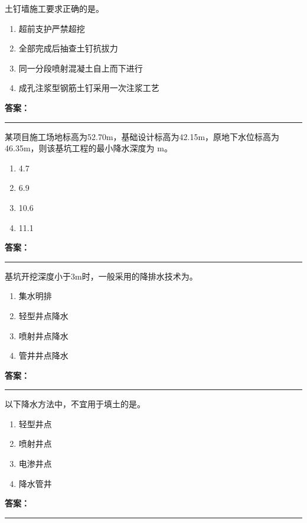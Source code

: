 \documentclass[UTF8,fontset=fandol,11pt]{ctexart}
\newcommand{\answerline}{\textcolor{answerred}{\rule{2.4cm}{0.7pt}}}
\begin{document}
\begin{quizbox}[title={第 10 题}]
土钉墙施工要求正确的是。\\
\begin{enumerate}[label=\Alph*.]
\item 超前支护严禁超挖
\item 全部完成后抽查土钉抗拔力
\item 同一分段喷射混凝土自上而下进行
\item 成孔注浆型钢筋土钉采用一次注浆工艺
\end{enumerate}
\textbf{\textcolor{answerred}{答案：}} \answerline
\end{quizbox}

\vspace{0.2em}

\begin{quizbox}[title={第 11 题}]
某项目施工场地标高为52.70m，基础设计标高为42.15m，原地下水位标高为46.35m，则该基坑工程的最小降水深度为 m。\\
\begin{enumerate}[label=\Alph*.]
\item 4.7
\item 6.9
\item 10.6
\item 11.1
\end{enumerate}
\textbf{\textcolor{answerred}{答案：}} \answerline
\end{quizbox}

\vspace{0.2em}

\begin{quizbox}[title={第 12 题}]
基坑开挖深度小于3m时，一般采用的降排水技术为。\\
\begin{enumerate}[label=\Alph*.]
\item 集水明排
\item 轻型井点降水
\item 喷射井点降水
\item 管井井点降水
\end{enumerate}
\textbf{\textcolor{answerred}{答案：}} \answerline
\end{quizbox}

\vspace{0.2em}

\begin{quizbox}[title={第 13 题}]
以下降水方法中，不宜用于填土的是。\\
\begin{enumerate}[label=\Alph*.]
\item 轻型井点
\item 喷射井点
\item 电渗井点
\item 降水管井
\end{enumerate}
\textbf{\textcolor{answerred}{答案：}} \answerline
\end{quizbox}
\end{document}
